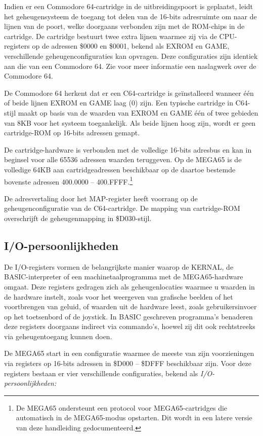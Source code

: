 Indien er een Commodore 64-cartridge in de uitbreidingspoort is geplaatst, leidt het geheugensysteem de toegang tot delen van de 16-bits adresruimte om naar de lijnen van de poort, welke doorgaans verbonden zijn met de ROM-chips in de cartridge. De cartridge bestuurt twee extra lijnen waarmee zij via de CPU-registers op de adressen \$0000 en \$0001, bekend als EXROM en GAME, verschillende geheugenconfiguraties kan opvragen. Deze configuraties zijn identiek aan die van een Commodore 64. Zie voor meer informatie een naslagwerk over de Commodore 64.

De Commodore 64 herkent dat er een C64-cartridge is geïnstalleerd wanneer één of beide lijnen EXROM en GAME laag (0) zijn. Een typische cartridge in C64-stijl maakt op basis van de waarden van EXROM en GAME één of twee gebieden van 8KB voor het systeem toegankelijk. Als beide lijnen hoog zijn, wordt er geen cartridge-ROM op 16-bits adressen gemapt.

De cartridge-hardware is verbonden met de volledige 16-bits adresbus en kan in beginsel voor alle 65536 adressen waarden teruggeven. Op de MEGA65 is de volledige 64KB aan cartridgeadressen beschikbaar op de daartoe bestemde bovenste adressen 400.0000 -- 400.FFFF.\footnote{De MEGA65 ondersteunt een protocol voor MEGA65-cartridges die automatisch in de MEGA65-modus opstarten. Dit wordt in een latere versie van deze handleiding gedocumenteerd.}

De adresvertaling door het MAP-register heeft voorrang op de geheugenconfiguratie van de C64-cartridge. De mapping van cartridge-ROM overschrijft de geheugenmapping in \$D030-stijl.

\subsection{I/O-persoonlijkheden}

De I/O-registers vormen de belangrijkste manier waarop de KERNAL, de BASIC-interpreter of een machinetaalprogramma met de MEGA65-hardware omgaat. Deze registers gedragen zich als geheugenlocaties waarmee u waarden in de hardware instelt, zoals voor het weergeven van grafische beelden of het voortbrengen van geluid, of waarden uit de hardware leest, zoals gebruikersinvoer op het toetsenbord of de joystick. In BASIC geschreven programma's benaderen deze registers doorgaans indirect via commando's, hoewel zij dit ook rechtstreeks via geheugentoegang kunnen doen.

De MEGA65 start in een configuratie waarmee de meeste van zijn voorzieningen via registers op 16-bits adressen in \$D000 -- \$DFFF beschikbaar zijn. Voor deze registers bestaan er vier verschillende configuraties, bekend als {\em I/O-persoonlijkheden:}


